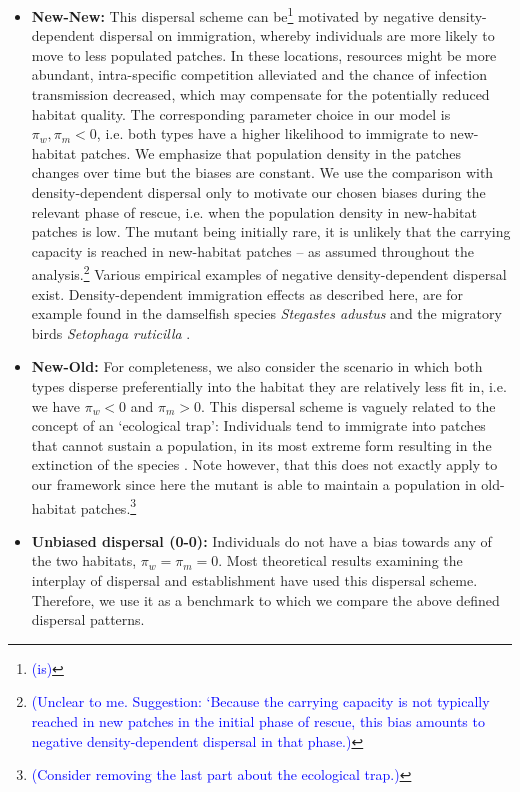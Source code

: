 \documentclass[a4paper,11pt]{article}
\newcommand{\francois}[1]{\textcolor{blue}{(#1)}}
\newcommand{\chg}[1]{\textcolor{change}{#1}}
\begin{document}
\begin{itemize}
	\item \textbf{New-New:} \chg{This dispersal scheme can be\footnote{\francois{is}} motivated by negative density-dependent dispersal on immigration,} whereby individuals are more likely to move to less populated patches. In these locations, resources might be more abundant, intra-specific competition alleviated and the chance of infection transmission decreased, which may compensate for the potentially reduced habitat quality. The corresponding parameter choice in our model is $\pi_w,\pi_m<0$, i.e. both types have a higher likelihood to immigrate to new-habitat patches. \chg{We emphasize that population density in the patches changes over time but the biases are constant. We use the comparison with density-dependent dispersal only to motivate our chosen biases during the relevant phase of rescue, i.e. when the population density in new-habitat patches is low.}
	The mutant being initially rare, it is unlikely that the carrying capacity is reached in new-habitat patches -- as assumed throughout the analysis.\footnote{\francois{Unclear to me. Suggestion: `Because the carrying capacity is not typically reached in new patches in the initial phase of rescue, this bias amounts to negative density-dependent dispersal in that phase.}} 
    Various empirical examples of negative density-dependent dispersal exist. Density-dependent immigration effects as described here, are for example found in the damselfish species \textit{Stegastes adustus} \citep{turgeon_2012} and the migratory birds \textit{Setophaga ruticilla} \citep{wilson_2017}. %

	\item \textbf{New-Old:} For completeness, we also consider the scenario in which both types disperse preferentially into the habitat they are relatively less fit in, i.e. we have $\pi_w<0$ and $\pi_m>0$. This dispersal scheme is \chg{vaguely} related to the concept of an `ecological trap': Individuals tend to immigrate into patches that cannot sustain a population, in its most extreme form resulting in the extinction of the species \citep{battin_2004}. \chg{Note however,} that this does not exactly apply to our framework since here the mutant is able to maintain a population in old-habitat patches.\footnote{\francois{Consider removing the last part about the ecological trap.}} 
	
	\item \textbf{Unbiased dispersal (0-0):} Individuals do not have a bias towards any of the two habitats, $\pi_w=\pi_m=0$. Most theoretical results examining the interplay of dispersal and establishment have \chg{used} this dispersal scheme. Therefore, we use it as a benchmark to which we compare the above defined dispersal patterns.
\end{itemize}
\end{document}
